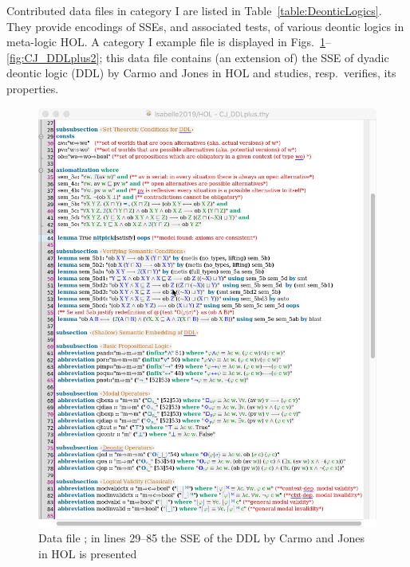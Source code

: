 \documentclass{article}
\begin{document}

Contributed data files in category I are listed in
Table~\ref{table:DeonticLogics}. They provide encodings of SSEs, and
associated tests, of various deontic logics in meta-logic HOL.  A category I 
example file is displayed in Figs.~\ref{fig:CJ_DDLplus1}--\ref{fig:CJ_DDLplus2}; this
data file contains (an extension of) the SSE of 
 dyadic deontic logic (DDL) by Carmo and Jones \cite{CJ13} in HOL and
 studies, resp.~verifies, its properties.

\begin{figure}[ht!]
 \includegraphics[width=\textwidth]{CJ_DDLplus1.png}
\caption{Data file \textsf{\small {}; in
    lines 29--85 the SSE of the DDL by  Carmo and Jones \cite{CJ13} in HOL is presented \label{fig:CJ_DDLplus1}}}
\end{figure}
\end{document}
